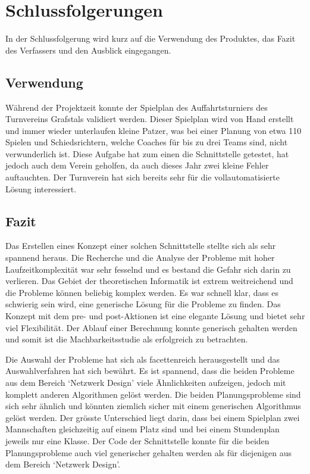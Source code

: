 %
%


\chapter{Schlussfolgerungen}\label{chap.Schlussfolgerungen}
In der Schlussfolgerung wird kurz auf die Verwendung des Produktes, das Fazit des Verfassers und den Ausblick eingegangen.

\section{Verwendung}\label{fazit_verwendung}
Während der Projektzeit konnte der Spielplan des Auffahrtsturniers des Turnvereins Grafstals validiert werden. Dieser Spielplan wird von Hand erstellt und immer wieder unterlaufen 
kleine Patzer, was bei einer Planung von etwa 110 Spielen und Schiedsrichtern, welche Coaches für bis zu drei Teams sind, nicht verwunderlich ist. Diese Aufgabe hat zum einen die Schnittstelle 
getestet, hat jedoch auch dem Verein geholfen, da auch dieses Jahr zwei kleine Fehler auftauchten. Der Turnverein hat sich bereits sehr für die vollautomatisierte Lösung interessiert.

\section{Fazit}\label{fazit}

Das Erstellen eines Konzept einer solchen Schnittstelle stellte sich als sehr spannend heraus. Die Recherche und die Analyse der Probleme mit hoher Laufzeitkomplexität war sehr fesselnd und es 
bestand die Gefahr sich darin zu verlieren. Das Gebiet der theoretischen Informatik ist extrem weitreichend und die Probleme können beliebig komplex werden. Es war schnell klar, dass es schwierig 
sein wird, eine generische Lösung für die Probleme zu finden. Das Konzept mit dem pre- und post-Aktionen ist eine elegante Lösung und bietet sehr viel Flexibilität. Der Ablauf einer Berechnung 
konnte generisch gehalten werden und somit ist die Machbarkeitsstudie als erfolgreich zu betrachten.

Die Auswahl der Probleme hat sich als facettenreich herausgestellt und das Auswahlverfahren hat sich bewährt. Es ist spannend, dass die beiden Probleme aus dem Bereich `Netzwerk Design' 
viele Ähnlichkeiten aufzeigen, jedoch mit komplett anderen Algorithmen gelöst werden. Die beiden Planungsprobleme sind sich sehr ähnlich und könnten ziemlich sicher mit einem generischen 
Algorithmus gelöst werden. Der grösste Unterschied liegt darin, dass bei einem Spielplan zwei Mannschaften gleichzeitig auf einem Platz sind und bei einem 
Stundenplan jeweils nur eine Klasse. Der Code der Schnittstelle konnte für die beiden Planungsprobleme auch viel generischer gehalten werden als für diejenigen aus dem Bereich 
`Netzwerk Design'.

